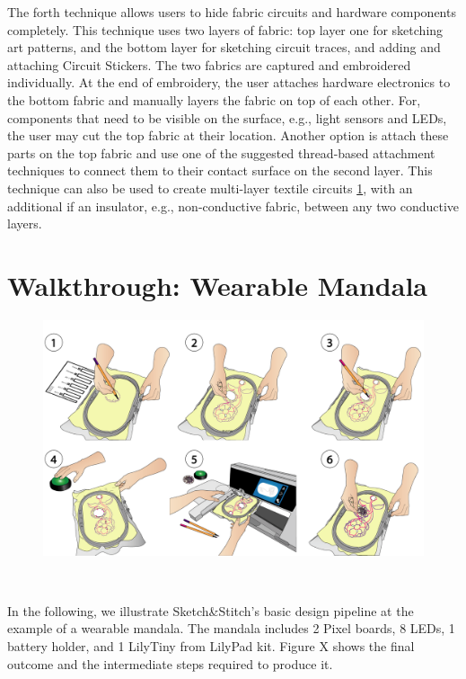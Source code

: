 \documentclass[header.tex]{subfiles}
\begin{document}
The forth technique allows users to hide fabric circuits and hardware components completely. This technique uses two layers of fabric: top layer one for sketching art patterns, and the bottom layer for sketching circuit traces, and adding and attaching Circuit Stickers. The two fabrics are captured and embroidered individually. At the end of embroidery, the user attaches hardware electronics to the bottom fabric and manually layers the fabric on top of each other. For, components that need to be visible on the surface, e.g., light sensors and LEDs, the user may cut the top fabric at their location. Another option is attach these parts on the top fabric and use one of the suggested thread-based attachment techniques to connect them to their contact surface on the second layer. This technique can also be used to create multi-layer textile circuits \ref{}, with an additional if an insulator, e.g., non-conductive fabric, between any two conductive layers. 







\section{Walkthrough: Wearable Mandala}

\begin{figure}
\centering
  \includegraphics[width=0.9\columnwidth]{figures/Walkthrough}
  \caption{}~\label{fig:Walkthrough}
  \vspace{-2.5em}
\end{figure}
In the following, we illustrate Sketch\&Stitch's basic design pipeline at the example of a wearable mandala. The mandala includes 2  Pixel boards, 8 LEDs, 1 battery holder, and 1 LilyTiny
from LilyPad kit. Figure X shows the final outcome and the intermediate steps required to produce it.
\end{document}
